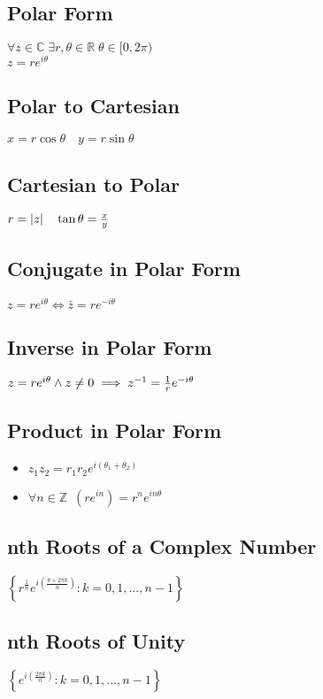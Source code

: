 \subsection*{Polar Form}
$\forall z \in \mathbb{C} \; \exists r, \theta \in \mathbb{R} \; \theta \in [0, 2\pi)$ \\
$z = re^{i\theta}$
\subsection*{Polar to Cartesian}
$x = r \cos \theta \quad y = r \sin \theta$
\subsection*{Cartesian to Polar}
$r = \left|z\right| \quad \tan \theta = \frac{x}{y}$
\subsection*{Conjugate in Polar Form}
$z = re^{i\theta} \iff \bar{z} = re^{-i\theta}$
\subsection*{Inverse in Polar Form}
$z = re^{i \theta} \land z \neq 0 \\
\implies z^{-1} = \frac{1}{r} e^{-i \theta}$
\subsection*{Product in Polar Form}
\begin{itemize}
	\item $z_1 z_2 = r_1 r_2 e^{i (\theta_1 + \theta_2)}$
	\item $\forall n \in \mathbb{Z} \enspace (re^{in}) = r^n e^{in\theta}$
\end{itemize}
\subsection*{nth Roots of a Complex Number}
$\left\{ r^{\frac{1}{n}} e^{i \left(\frac{\theta + 2 \pi k}{n} \right)} : k = 0, 1, ..., n - 1 \right\}$
\subsection*{nth Roots of Unity}
$\left\{ e^{i \left(\frac{2 \pi k}{n} \right)} : k = 0, 1, ..., n - 1 \right\}$
